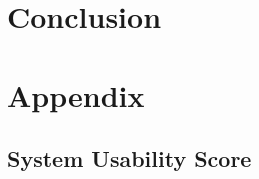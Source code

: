 \documentclass[12pt,numbers=noenddot,parskip,bibliography=totocnumbered,listof=totocnumbered,draft]{scrreprt}
\begin{document}
\chapter{Conclusion}



\appendix
\chapter{Appendix}

\newpage
\section{System Usability Score}
\vfill
{}
\label{sus}
\vfill
\end{document}
